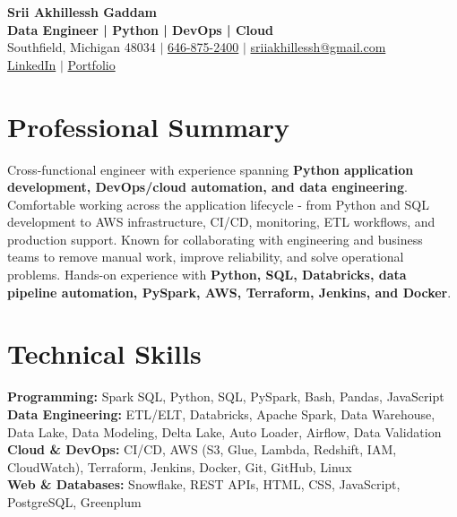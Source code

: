 \documentclass[letterpaper,10pt]{article}
\begin{document}
\fontsize{9.35pt}{10.45pt}\selectfont

\begin{center}
    {\LARGE \textbf{Srii Akhillessh Gaddam}} \\[-1pt]
    \textbf{Data Engineer | Python | DevOps | Cloud} \\[2pt]
    Southfield, Michigan 48034 $|$
    \href{tel:6468752400}{646-875-2400} $|$
    \href{mailto:sriiakhillessh@gmail.com}{sriiakhillessh@gmail.com} \\[1pt]
    \href{https://www.linkedin.com/in/srii-akhiilessh-gaddam-b48668191/}{LinkedIn} $|$
    \href{https://sriiakhillesshg.github.io/portfolio/}{Portfolio}
\end{center}
\vspace{-8pt}

\section{Professional Summary}
\small{Cross-functional engineer with experience spanning \textbf{Python application development, DevOps/cloud automation, and data engineering}. Comfortable working across the application lifecycle - from Python and SQL development to AWS infrastructure, CI/CD, monitoring, ETL workflows, and production support. Known for collaborating with engineering and business teams to remove manual work, improve reliability, and solve operational problems. Hands-on experience with \textbf{Python, SQL, Databricks, data pipeline automation, PySpark, AWS, Terraform, Jenkins, and Docker}.}

\section{Technical Skills}
\small{
\textbf{Programming:} Spark SQL, Python, SQL, PySpark, Bash, Pandas, JavaScript \\
\textbf{Data Engineering:} ETL/ELT, Databricks, Apache Spark, Data Warehouse, Data Lake, Data Modeling, Delta Lake, Auto Loader, Airflow, Data Validation \\
\textbf{Cloud \& DevOps:} CI/CD, AWS (S3, Glue, Lambda, Redshift, IAM, CloudWatch), Terraform, Jenkins, Docker, Git, GitHub, Linux \\
\textbf{Web \& Databases:} Snowflake, REST APIs, HTML, CSS, JavaScript, PostgreSQL, Greenplum
}
\end{document}
